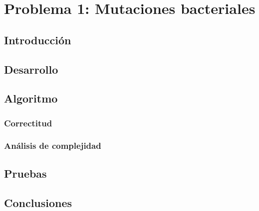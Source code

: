 \section{Problema 1: Mutaciones bacteriales}
 
\subsection{Introducci\'on}


 
\subsection{Desarrollo}
 
 

\subsection{Algoritmo}
 

\subsubsection{Correctitud} 



\subsubsection{An\'alisis de complejidad}
 
 

\subsection{Pruebas}



\subsection{Conclusiones}
